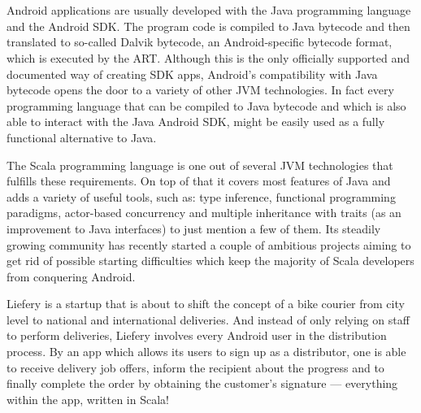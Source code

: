 \section*{}

Android applications are usually developed with the Java programming language and the Android \ac{SDK}. The program code is compiled to Java bytecode and then translated to so-called Dalvik bytecode, an Android-specific bytecode format, which is executed by the \ac{ART}. Although this is the only officially supported and documented way of creating SDK apps, Android's compatibility with Java bytecode opens the door to a variety of other \ac{JVM} technologies. In fact every programming language that can be compiled to Java bytecode and which is also able to interact with the Java Android SDK, might be easily used as a fully functional alternative to Java.

The Scala programming language is one out of several JVM technologies that fulfills these requirements. On top of that it covers most features of Java and adds a variety of useful tools, such as: type inference, functional programming paradigms, actor-based concurrency and multiple inheritance with traits (as an improvement to Java interfaces) to just mention a few of them. Its steadily growing community has recently started a couple of ambitious projects aiming to get rid of possible starting difficulties which keep the majority of Scala developers from conquering Android.

Liefery is a startup that is about to shift the concept of a bike courier from city level to national and international deliveries. And instead of only relying on staff to perform deliveries, Liefery involves every Android user in the distribution process. By an app which allows its users to sign up as a distributor, one is able to receive delivery job offers, inform the recipient about the progress and to finally complete the order by obtaining the customer's signature — everything within the app, written in Scala!